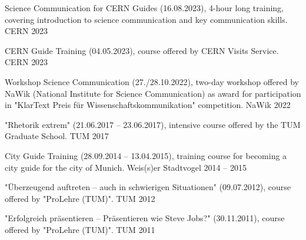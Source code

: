 \begin{cvhonors}

    \cvhonor
      {Science Communication for CERN Guides} %
      {(16.08.2023), 4-hour long training, covering introduction to science communication and key communication skills.} %
      {CERN} %
      {2023} %
  
    \cvhonor
      {CERN Guide Training} %
      {(04.05.2023), course offered by CERN Visits Service.} %
      {CERN} %
      {2023} %
  
  \cvhonor
  {Workshop Science Communication} %
  {(27./28.10.2022), two-day workshop offered by NaWik (National Institute for Science Communication) as award for participation in "KlarText Preis für Wissenschaftskommunikation" competition.} %
  {NaWik} %
  {2022} %

    \cvhonor
      {"Rhetorik extrem"} %
      {(21.06.2017 -- 23.06.2017), intensive course offered by the TUM Graduate School.} %
      {TUM} %
      {2017} %
  
    \cvhonor
      {City Guide Training} %
      {(28.09.2014 -- 13.04.2015), training course for becoming a city guide for the city of Munich.} %
      {Weis(s)er Stadtvogel} %
      {2014 -- 2015} %
  
    \cvhonor
      {"Überzeugend auftreten – auch in schwierigen Situationen"} %
      {(09.07.2012), course offered by "ProLehre (TUM)".} %
      {TUM} %
      {2012} %
  
    \cvhonor
      {"Erfolgreich präsentieren – Präsentieren wie Steve Jobs?"} %
      {(30.11.2011), course offered by "ProLehre (TUM)".} %
      {TUM} %
      {2011} %

  \end{cvhonors}
  


